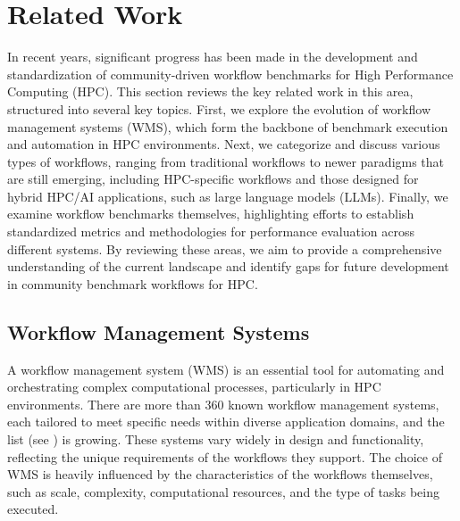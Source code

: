%
%
%
%
%
%

\section{Related Work}
\label{sec:related}

In recent years, significant progress has been made in the development and standardization of community-driven workflow benchmarks for High Performance Computing (HPC). This section reviews the key related work in this area, structured into several key topics. First, we explore the evolution of workflow management systems (WMS), which form the backbone of benchmark execution and automation in HPC environments. Next, we categorize and discuss various types of workflows, ranging from traditional workflows to newer paradigms that are still emerging, including HPC-specific workflows and those designed for hybrid HPC/AI applications, such as large language models (LLMs). Finally, we examine workflow benchmarks themselves, highlighting efforts to establish standardized metrics and methodologies for performance evaluation across different systems. By reviewing these areas, we aim to provide a comprehensive understanding of the current landscape and identify gaps for future development in community benchmark workflows for HPC.


\subsection{Workflow Management Systems}

A workflow management system (WMS) is an essential tool for automating and orchestrating complex computational processes, particularly in HPC environments. There are more than 360 known workflow management systems, each tailored to meet specific needs within diverse application domains, and the list (see \citep{workflow-list}) is growing. These systems vary widely in design and functionality, reflecting the unique requirements of the workflows they support. The choice of WMS is heavily influenced by the characteristics of the workflows themselves, such as scale, complexity, computational resources, and the type of tasks being executed.


